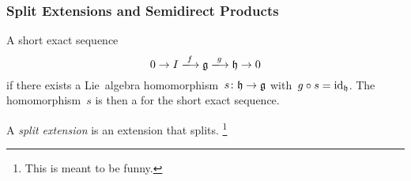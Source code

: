 


\subsubsection{Split Extensions and Semidirect Products}


\begin{definition}
  A short exact sequence
  \[
    0
    \to
    I
    \xlongto{f}
    \glie
    \xlongto{g}
    \hlie
    \to
    0
  \]
   if there exists a Lie~algebra homomorphism~$s \colon \mathfrak{h} \to \mathfrak{g}$ with~$g \circ s = \operatorname{id}_{\mathfrak{h}}$.
  The homomorphism~$s$ is then a  for the short exact sequence.
  
  A \emph{split extension} is an extension that splits.%
  \footnote{This is meant to be funny.}
\end{definition}


